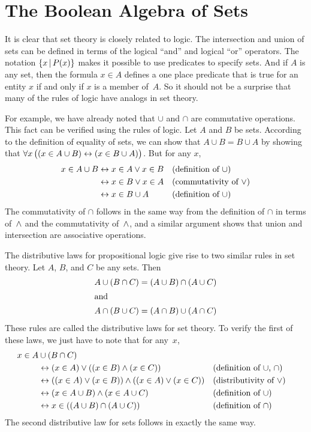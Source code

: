 \section{The Boolean Algebra of Sets}\label{S-sets-2}

It is clear that set theory is closely related to logic.
The intersection and union
of sets can be defined in terms of the logical ``and''
and logical ``or'' operators.
The notation $\{x\,|\, P(x)\}$ makes it possible to use predicates
to specify sets.  And if $A$ is any set, then the formula
$x\in A$ defines a one place predicate that is true for an entity $x$
if and only if $x$ is a member of~$A$.  So it should not be a
surprise that many of the rules of logic have analogs in
set theory.

For example, we have already noted that $\cup$ and $\cap$ are
commutative operations.   This fact can be verified using the
rules of logic.  Let $A$ and $B$ be sets.  According to the definition 
of equality of sets, we can show that $A\cup B=B\cup A$ by showing
that $\forall x\,\big((x\in A\cup B)\leftrightarrow(x\in B\cup A)\big)$.
But for any $x$,
\begin{align*}
x\in A\cup B &\leftrightarrow x\in A \vee x\in B  &&\text{(definition of $\cup$)}\\
             &\leftrightarrow x\in B \vee x\in A  &&\text{(commutativity of $\vee$)}\\
             &\leftrightarrow x\in B \cup A      &&\text{(definition of $\cup$)}
\end{align*}
The commutativity of $\cap$ follows in the same way from the
definition of $\cap$ in terms of~$\wedge$ and the commutativity of~$\wedge$,
and a similar argument shows that union and intersection are
associative operations.

The distributive laws for propositional logic give rise to two
similar rules in set theory.  Let $A$, $B$, and $C$ be any sets.
Then
\begin{align*}
A\cup(B\cap C)&=(A\cup B)\cap(A\cup C)\\
\intertext{and}
A\cap(B\cup C)&=(A\cap B)\cup(A\cap C)
\end{align*}
These rules are called the distributive laws for
set theory.  To verify the first of these laws, we just have to
note that for any~$x$,
\begin{align*}
x\in A&\cup(B\cap C) \\
                    &\leftrightarrow (x\in A)\vee((x\in B)\wedge (x\in C))  
                              &&\text{(definition of $\cup$, $\cap$)}\\
                    &\leftrightarrow ((x\in A)\vee(x\in B)) \wedge((x \in A)\vee (x\in C))
                              &&\text{(distributivity of $\vee$)}\\
                    &\leftrightarrow (x\in A\cup B) \wedge (x \in A\cup C)
                              &&\text{(definition of $\cup$)}\\
                    &\leftrightarrow x\in ((A\cup B)\cap(A\cup C))
                              &&\text{(definition of $\cap$)}
\end{align*}
The second distributive law for sets follows in exactly the
same way.

